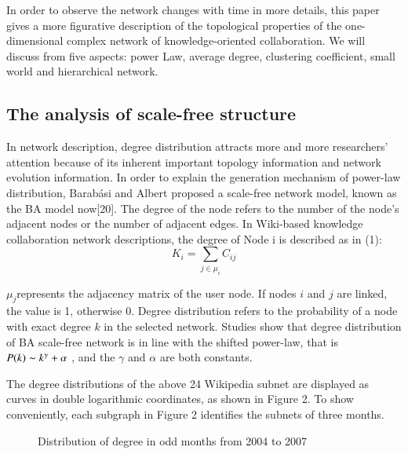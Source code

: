 \documentclass{elsarticle}
\begin{document}
In order to observe the network changes with time in more details,
this paper gives a more figurative description of the topological
properties of the one-dimensional complex network of
knowledge-oriented collaboration. We will discuss from five aspects: power Law, average degree, clustering coefficient, small world and hierarchical network.

\subsection{The analysis of scale-free structure}
\label{sec:analysis-scale-free}

In network description, degree distribution attracts more and more researchers’ attention because of its inherent important topology information and network evolution information. In order to explain the generation mechanism of power-law distribution, Barabási and Albert proposed a scale-free network model, known as the BA model now[20].  The degree of the node refers to the number of the node's adjacent nodes or the number of adjacent edges. In Wiki-based knowledge collaboration network descriptions, the degree of Node i is described as in (1): 
\begin{equation}
  K_i=\sum_{j\in\mu_i}C_{ij}
\end{equation}

$\mu_j$represents the adjacency matrix of the user node. If nodes $i$
and $j$ are linked, the value  is 1, otherwise 0. Degree distribution
refers to the probability of a node with exact degree $k$ in the
selected network. Studies show that degree distribution of BA
scale-free network is in line with the shifted power-law, that is
$P(k)\thicksim k^\gamma+\alpha$  , and the $\gamma$ and $\alpha$ are both
constants. 


The degree distributions of the above 24 Wikipedia subnet are
displayed as curves in double logarithmic coordinates, as shown in
Figure 2. To show conveniently, each subgraph in Figure 2 identifies
the subnets of three months.
\begin{figure}[htpb]
  \centering
  \subfigure[a]{
     \scalebox{0.18}{\texttt{[image: 02-1]}}
   } \quad
  \subfigure[b]{ 
       \scalebox{0.18}{\texttt{[image: 02-2]}}
   } 
   
    \subfigure[c]{
     \scalebox{0.18}{\texttt{[image: 02-3]}}
   } \quad
  \subfigure[d]{ 
       \scalebox{0.18}{\texttt{[image: 02-4]}}
   } 
  
    \subfigure[e]{
     \scalebox{0.18}{\texttt{[image: 02-5]}}
   } \quad
  \subfigure[f]{ 
       \scalebox{0.18}{\texttt{[image: 02-6]}}
   } 

    \subfigure[g]{
     \scalebox{0.18}{\texttt{[image: 02-7]}}
   } \quad
  \subfigure[h]{ 
       \scalebox{0.18}{\texttt{[image: 02-8]}}
   } 
   \caption{Distribution of degree in odd months from 2004 to 2007}
\end{figure}
\end{document}
